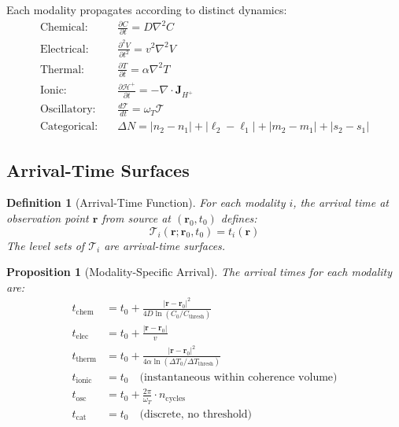 \documentclass[aps,prd,twocolumn,superscriptaddress,floatfix,nofootinbib]{revtex4-2}
\newtheorem{definition}[theorem]{Definition}
\newtheorem{proposition}[theorem]{Proposition}
\theoremstyle{remark}
\newcommand{\Tcat}{\mathcal{T}}
\newcommand{\Hfield}{\mathcal{H}^+}
\newcommand{\rxnpos}{\mathbf{r}_0}
\newcommand{\rxntime}{t_0}
\newcommand{\obspos}{\mathbf{r}}
\begin{document}
Each modality propagates according to distinct dynamics:
\begin{align}
\text{Chemical:} \quad & \frac{\partial C}{\partial t} = D\nabla^2 C \\
\text{Electrical:} \quad & \frac{\partial^2 V}{\partial t^2} = v^2\nabla^2 V \\
\text{Thermal:} \quad & \frac{\partial T}{\partial t} = \alpha\nabla^2 T \\
\text{Ionic:} \quad & \frac{\partial \Hfield}{\partial t} = -\nabla \cdot \mathbf{J}_{H^+} \\
\text{Oscillatory:} \quad & \frac{d\Tcat}{dt} = \omega_T \Tcat \\
\text{Categorical:} \quad & \Delta N = |n_2 - n_1| + |\ell_2 - \ell_1| + |m_2 - m_1| + |s_2 - s_1|
\end{align}

\subsection{Arrival-Time Surfaces}

\begin{definition}[Arrival-Time Function]
For each modality $i$, the arrival time at observation point $\obspos$ from source at $(\rxnpos, \rxntime)$ defines:
\begin{equation}
\mathcal{T}_i(\obspos; \rxnpos, \rxntime) = t_i(\obspos)
\end{equation}
The level sets of $\mathcal{T}_i$ are arrival-time surfaces.
\end{definition}

\begin{proposition}[Modality-Specific Arrival]
\label{prop:arrival_times}
The arrival times for each modality are:
\begin{align}
t_{\text{chem}} &= \rxntime + \frac{|\obspos - \rxnpos|^2}{4D \ln(C_0/C_{\text{thresh}})} \\
t_{\text{elec}} &= \rxntime + \frac{|\obspos - \rxnpos|}{v} \\
t_{\text{therm}} &= \rxntime + \frac{|\obspos - \rxnpos|^2}{4\alpha \ln(\Delta T_0/\Delta T_{\text{thresh}})} \\
t_{\text{ionic}} &= \rxntime \quad \text{(instantaneous within coherence volume)} \\
t_{\text{osc}} &= \rxntime + \frac{2\pi}{\omega_T} \cdot n_{\text{cycles}} \\
t_{\text{cat}} &= \rxntime \quad \text{(discrete, no threshold)}
\end{align}
\end{proposition}
\end{document}
